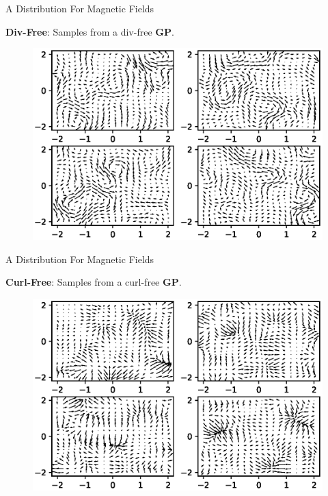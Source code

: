 \documentclass{beamer}
\begin{document}
\begin{frame}{A Distribution For Magnetic Fields}

  \textbf{Div-Free}: Samples from a div-free \textbf{GP}.

  \begin{figure}
    \includegraphics[width=\linewidth]{plots/div_free.eps}
  \end{figure}

\end{frame}

\begin{frame}{A Distribution For Magnetic Fields}

  \textbf{Curl-Free}: Samples from a curl-free \textbf{GP}.

  \begin{figure}
    \includegraphics[width=\linewidth]{plots/curl_free.eps}
  \end{figure}

\end{frame}
\end{document}
